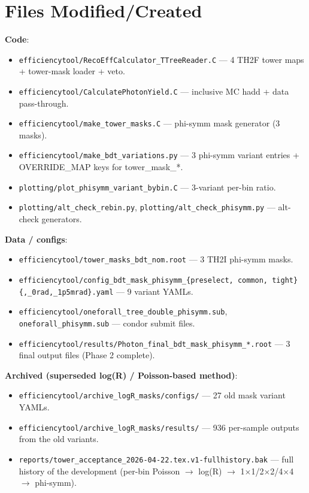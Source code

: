 \documentclass[11pt,a4paper]{article}
\begin{document}
\section{Files Modified/Created}

\textbf{Code}:
\begin{itemize}
  \item \texttt{efficiencytool/RecoEffCalculator\_TTreeReader.C} --- 4 TH2F
    tower maps + tower-mask loader + veto.
  \item \texttt{efficiencytool/CalculatePhotonYield.C} --- inclusive MC
    hadd + data pass-through.
  \item \texttt{efficiencytool/make\_tower\_masks.C} --- phi-symm
    mask generator (3 masks).
  \item \texttt{efficiencytool/make\_bdt\_variations.py} --- 3
    phi-symm variant entries + OVERRIDE\_MAP keys for tower\_mask\_*.
  \item \texttt{plotting/plot\_phisymm\_variant\_bybin.C} --- 3-variant
    per-bin ratio.
  \item \texttt{plotting/alt\_check\_rebin.py},
    \texttt{plotting/alt\_check\_phisymm.py} --- alt-check generators.
\end{itemize}

\textbf{Data / configs}:
\begin{itemize}
  \item \texttt{efficiencytool/tower\_masks\_bdt\_nom.root} ---
    3 TH2I phi-symm masks.
  \item \texttt{efficiencytool/config\_bdt\_mask\_phisymm\_\{preselect,
    common, tight\}\{,\_0rad,\_1p5mrad\}.yaml} --- 9 variant YAMLs.
  \item \texttt{efficiencytool/oneforall\_tree\_double\_phisymm.sub},
    \texttt{oneforall\_phisymm.sub} --- condor submit files.
  \item \texttt{efficiencytool/results/Photon\_final\_bdt\_mask\_phisymm\_*.root}
    --- 3 final output files (Phase 2 complete).
\end{itemize}

\textbf{Archived (superseded log(R) / Poisson-based method)}:
\begin{itemize}
  \item \texttt{efficiencytool/archive\_logR\_masks/configs/} --- 27
    old mask variant YAMLs.
  \item \texttt{efficiencytool/archive\_logR\_masks/results/} --- 936
    per-sample outputs from the old variants.
  \item \texttt{reports/tower\_acceptance\_2026-04-22.tex.v1-fullhistory.bak}
    --- full history of the development (per-bin Poisson $\to$
    log(R) $\to$ 1$\times$1/2$\times$2/4$\times$4 $\to$ phi-symm).
\end{itemize}
\end{document}
